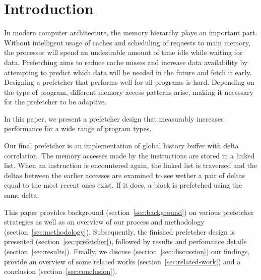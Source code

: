 \section{Introduction}
\label{sec:introduction}

In modern computer architecture, the memory hierarchy plays an important part.
Without intelligent usage of caches and scheduling of requests to main memory, the processor will spend an undesirable amount of time idle while waiting for data.
Prefetching aims to reduce cache misses and increase data availability by attempting to predict which data will be needed in the future and fetch it early. 
Designing a prefetcher that performs well for all programs is hard.
Depending on the type of program, different memory access patterns arise, making it necessary for the prefetcher to be adaptive.

In this paper, we present a prefetcher design that measurably increases performance for a wide range of program types.

Our final prefetcher is an implementation of global history buffer with delta correlation.
The memory accesses made by the instructions are stored in a linked list.
When an instruction is encountered again, the linked list is traversed and the deltas between the earlier accesses are examined to see wether a pair of deltas equal to the most recent ones exist.
If it does, a block is prefetched using the same delta.

This paper provides background (section~\ref{sec:background}) on various prefetcher strategies as well as an overview of our process and methodology (section~\ref{sec:methodology}).
Subsequently, the finished prefetcher design is presented (section~\ref{sec:prefetcher}), followed by results and perfomance details (section~\ref{sec:results}).
Finally, we discuss (section~\ref{sec:discussion}) our findings, provide an overview of some related works (section~\ref{sec:related-work}) and a conclusion (section~\ref{sec:conclusion}).


